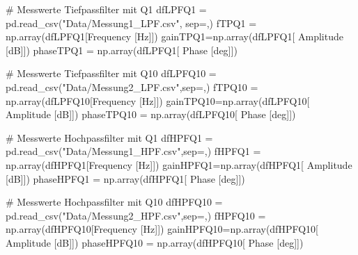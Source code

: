 \documentclass[
  ngerman,
  letterpaper,
  DIV=11]{scrreprt}
\newenvironment{Shaded}{}{}
\newcommand{\CommentTok}[1]{\textcolor[rgb]{0.42,0.45,0.49}{#1}}
\newcommand{\NormalTok}[1]{\textcolor[rgb]{0.14,0.16,0.18}{#1}}
\newcommand{\OperatorTok}[1]{\textcolor[rgb]{0.14,0.16,0.18}{#1}}
\newcommand{\StringTok}[1]{\textcolor[rgb]{0.01,0.18,0.38}{#1}}
\begin{document}
\begin{Shaded}
\begin{Highlighting}[]
\CommentTok{\# Messwerte Tiefpassfilter mit Q1}
\NormalTok{dfLPFQ1 }\OperatorTok{=}\NormalTok{ pd.read\_csv(}\StringTok{"Data/Messung1\_LPF.csv"}\NormalTok{, sep}\OperatorTok{=}\StringTok{\textquotesingle{},\textquotesingle{}}\NormalTok{)}
\NormalTok{fTPQ1 }\OperatorTok{=}\NormalTok{ np.array(dfLPFQ1[}\StringTok{\textquotesingle{}Frequency [Hz]\textquotesingle{}}\NormalTok{])}
\NormalTok{gainTPQ1}\OperatorTok{=}\NormalTok{np.array(dfLPFQ1[}\StringTok{\textquotesingle{} Amplitude [dB]\textquotesingle{}}\NormalTok{])}
\NormalTok{phaseTPQ1 }\OperatorTok{=}\NormalTok{ np.array(dfLPFQ1[}\StringTok{\textquotesingle{} Phase [deg]\textquotesingle{}}\NormalTok{])}

\CommentTok{\# Messwerte Tiefpassfilter mit Q10}
\NormalTok{dfLPFQ10 }\OperatorTok{=}\NormalTok{ pd.read\_csv(}\StringTok{"Data/Messung2\_LPF.csv"}\NormalTok{,sep}\OperatorTok{=}\StringTok{\textquotesingle{},\textquotesingle{}}\NormalTok{)}
\NormalTok{fTPQ10 }\OperatorTok{=}\NormalTok{ np.array(dfLPFQ10[}\StringTok{\textquotesingle{}Frequency [Hz]\textquotesingle{}}\NormalTok{])}
\NormalTok{gainTPQ10}\OperatorTok{=}\NormalTok{np.array(dfLPFQ10[}\StringTok{\textquotesingle{} Amplitude [dB]\textquotesingle{}}\NormalTok{])}
\NormalTok{phaseTPQ10 }\OperatorTok{=}\NormalTok{ np.array(dfLPFQ10[}\StringTok{\textquotesingle{} Phase [deg]\textquotesingle{}}\NormalTok{])}

\CommentTok{\# Messwerte Hochpassfilter mit Q1}
\NormalTok{dfHPFQ1 }\OperatorTok{=}\NormalTok{ pd.read\_csv(}\StringTok{"Data/Messung1\_HPF.csv"}\NormalTok{,sep}\OperatorTok{=}\StringTok{\textquotesingle{},\textquotesingle{}}\NormalTok{)}
\NormalTok{fHPFQ1 }\OperatorTok{=}\NormalTok{ np.array(dfHPFQ1[}\StringTok{\textquotesingle{}Frequency [Hz]\textquotesingle{}}\NormalTok{])}
\NormalTok{gainHPFQ1}\OperatorTok{=}\NormalTok{np.array(dfHPFQ1[}\StringTok{\textquotesingle{} Amplitude [dB]\textquotesingle{}}\NormalTok{])}
\NormalTok{phaseHPFQ1 }\OperatorTok{=}\NormalTok{ np.array(dfHPFQ1[}\StringTok{\textquotesingle{} Phase [deg]\textquotesingle{}}\NormalTok{])}

\CommentTok{\# Messwerte Hochpassfilter mit Q10}
\NormalTok{dfHPFQ10 }\OperatorTok{=}\NormalTok{ pd.read\_csv(}\StringTok{"Data/Messung2\_HPF.csv"}\NormalTok{,sep}\OperatorTok{=}\StringTok{\textquotesingle{},\textquotesingle{}}\NormalTok{)}
\NormalTok{fHPFQ10 }\OperatorTok{=}\NormalTok{ np.array(dfHPFQ10[}\StringTok{\textquotesingle{}Frequency [Hz]\textquotesingle{}}\NormalTok{])}
\NormalTok{gainHPFQ10}\OperatorTok{=}\NormalTok{np.array(dfHPFQ10[}\StringTok{\textquotesingle{} Amplitude [dB]\textquotesingle{}}\NormalTok{])}
\NormalTok{phaseHPFQ10 }\OperatorTok{=}\NormalTok{ np.array(dfHPFQ10[}\StringTok{\textquotesingle{} Phase [deg]\textquotesingle{}}\NormalTok{])}


\end{Highlighting}
\end{Shaded}
\end{document}
